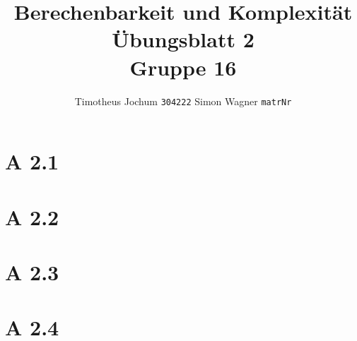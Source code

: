 \documentclass[a4paper,12pt]{article}
\title{Berechenbarkeit und Komplexität \\ Übungsblatt 2 \\ Gruppe 16}
\author{Timotheus Jochum {\small\texttt{304222}} Simon Wagner \small\texttt{matrNr}}
\begin{document}
\maketitle

\newpage

\section*{A 2.1}

\section*{A 2.2}

\section*{A 2.3}

\section*{A 2.4}
\end{document}
